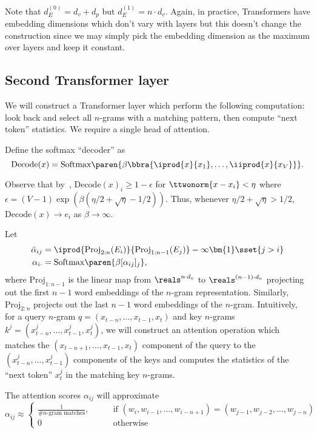 
Note that $d_E^{(0)} = d_v + d_p$ but $d_E^{(1)} = n \cdot d_v$. Again, in practice, Transformers have embedding dimensions which don't vary with layers but this doesn't change the construction since we may simply pick the embedding dimension as the maximum over layers and keep it constant.

\subsection*{Second Transformer layer}

We will construct a Transformer layer which perform the following computation: look back and select all $n$-grams with a matching pattern, then compute ``next token'' statistics. We require a single head of attention.

Define the softmax ``decoder'' as 
\[\mathrm{Decode}(x) = \mathrm{Softmax}\paren{\beta \bbra{\iprod{x}{x_1}, \ldots, \iiprod{x}{x_V}}}.\]

Observe that by~, $\mathrm{Decode}(x)_i \geq 1 - \epsilon$ for $\ttwonorm{x - x_i} < \eta$ where $\epsilon = (V -1) \exp(\beta(\eta/2 + \sqrt{\eta} - 1/2))$. Thus, whenever $\eta/2 + \sqrt{\eta} > 1/2$, $\mathrm{Decode}(x) \to e_i$ as $\beta \to \infty$.

Let
\begin{align*}
    \bar{\alpha}_{ij} &= \iprod{\mathrm{Proj}_{2:n}(E_i)}{\mathrm{Proj}_{1:n-1}(E_j)} - \infty \bm{1}\sset{j > i}\\
    \alpha_{i\cdot} &= \mathrm{Softmax}\paren{\beta [\alpha_{ij}]_j},
\end{align*}
where $\mathrm{Proj}_{1:n-1}$ is the linear map from $\reals^{n \cdot d_v}$ to $\reals^{(n-1) \cdot d_v}$ projecting out the first $n-1$ word embeddings of the $n$-gram representation. Similarly, $\mathrm{Proj}_{2:n}$ projects out the last $n-1$ word embeddings of the $n$-gram. Intuitively, for a query $n$-gram $q = (x_{t-n}, \ldots, x_{t-1}, x_{t})$ and key $n$-grams $k^j = (x_{t-n}^j, \ldots, x_{t-1}^j, x_{t}^j)$, we will construct an attention operation which matches the $(x_{t-n+1}, \ldots, x_{t-1}, x_{t})$ component of the query to the $(x_{t-n}^j, \ldots, x_{t-1}^j)$ components of the keys and computes the statistics of the ``next token'' $x_t^j$ in the matching key $n$-grams.

The attention scores $\alpha_{ij}$ will approximate
\begin{equation*}
    \alpha_{ij} \approx  \begin{cases} \frac{1}{\# \text{$n$-gram matches}}, \qquad &\text{if } (w_i, w_{i-1}, \ldots, w_{i-n+1}) = (w_{j-1}, w_{j-2}, \ldots, w_{j-n}) \\ 0 &  \text{otherwise}\end{cases}
\end{equation*}


